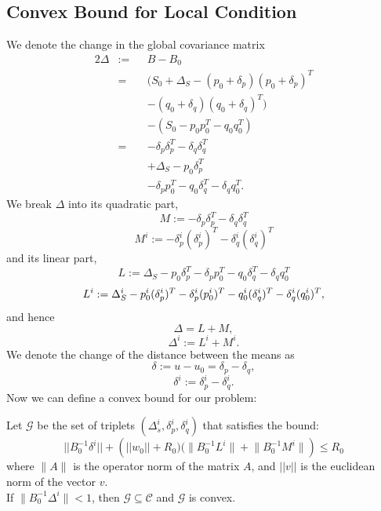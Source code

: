 \subsection{Convex Bound for Local Condition}
We denote the change in the global covariance matrix
\begin{alignat*}{2}
\Delta & := && B-B_0 \\
& = && (S_0+\Delta_S - (p_0+\delta_p)(p_0+\delta_p)^T \\
& && - (q_0+\delta_q)(q_0+\delta_q)^T) \\
& && - (S_0 - p_0p_0^T - q_0q_0^T) \\
& = && - \delta_p\delta_p^T - \delta_q\delta_q^T \\
& && + \Delta_S - p_0\delta_p^T \\
& && - \delta_pp_0^T - q_0\delta_q^T - \delta_qq_0^T.
\end{alignat*}
We break $\Delta$ into its quadratic part,
\begin{equation*}
M:= - \delta_p\delta_p^T - \delta_q\delta_q^T
\end{equation*}
\begin{equation*}
M^i:= - \delta_p^i(\delta_p^i)^T - \delta_q^i(\delta_q^i)^T
\end{equation*}
and its linear part,
\begin{equation*}
L:= \Delta_S - p_0\delta_p^T - \delta_pp_0^T - q_0\delta_q^T - \delta_qq_0^T
\end{equation*}
\begin{equation*}
\\ L^i := \Delta_S^i - p_0^i(\delta_p^i)^T - \delta_p^i(p_0^i)^T -
q_0^i(\delta_q^i)^T - \delta_q^i(q_0^i)^T,
\end{equation*}
and hence
\begin{equation*}
\Delta= L+ M, 
\end{equation*}
\begin{equation*}
\Delta^i:= L^i+ M^i.
\end{equation*}
We denote the change of the distance between the means as
\begin{equation*}
\delta:= u-u_0 = \delta_p - \delta_q, 
\end{equation*}
\begin{equation*}
\delta^i:=\delta_p^i - \delta_q^i.
\end{equation*}
Now we can define a convex bound for our problem:
\begin{lemma} \label{convexBound}
Let $\mathcal{G}$ be the set of triplets $(\Delta_s^i, \delta_p^i, \delta_q^i)$
 that satisfies the bound:
 \begin{equation} \label{eq:convexBound}
||B_0^{-1}\delta^i|| + \left(||w_0||+R_0)(\Big \| B_0^{-1}L^i \Big \| + \Big \| B_0^{-1}M^i \Big \| \right) \leq  R_0
\end{equation}
where $\Big \| A \Big \|$ is the operator norm of the matrix $A$, and $||v||$ is the euclidean norm of the vector $v$.
\\If $\Big \| B_0^{-1}\Delta^i \Big \| < 1$, then $\mathcal{G}\subseteq \mathcal{C}$ and $\mathcal{G}$ is convex.
\end{lemma}
